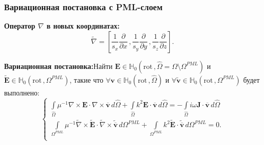 \documentclass[aspectratio=43]{beamer}
\newcommand{\MakeTitle}[1]{\frametitle{\hspace{1.5em}\textbf{#1} \hfill \insertframenumber{} }}
\begin{document}

\begin{frame}
	\MakeTitle{Вариационная постановка с PML-слоем}
	\textbf{Оператор $\nabla$ в новых координатах:}
	\begin{equation*}
		\tilde{\nabla} = \left[ \frac{1}{s_x} \frac{\partial}{\partial x} \,, \frac{1}{s_y} \frac{\partial}{\partial y} \,, \frac{1}{s_z} \frac{\partial}{\partial z} \right] .
	\end{equation*}

	\textbf{Вариационная постановка:}\newline Найти $\mathbf{E} \in \mathbb{H}_{0}( \mathrm{rot}\,, \widehat{\Omega} = \Omega \setminus {\Omega^{PML}} )$ и  $\tilde{\mathbf{E}} \in \mathbb{H}_{0}( \mathrm{rot}\,, {\Omega^{PML}} )$, такие что $\forall \mathbf{v} \in \mathbb{H}_{0}( \mathrm{rot}\,, \widehat{\Omega} )$ и $\forall \tilde{\mathbf{v}} \in \mathbb{H}_{0}( \mathrm{rot}\,, {\Omega^{PML}} )$ будет выполнено:
\begin{equation*}
	\begin{cases}
		\displaystyle
		\int\limits_{\widehat{\Omega}} \mu^{-1} \nabla \times \mathbf{E} \cdot \nabla \times \overline{\mathbf{v}} \,d\widehat{\Omega} + \int\limits_{\widehat{\Omega}} k^{2} \mathbf{E} \cdot \overline{\mathbf{v}} \,d\widehat{\Omega} = - \int\limits_{\widehat{\Omega}} i \omega \mathbf{J} \cdot \overline{\mathbf{v}} \,d\widehat{\Omega} \\
		\displaystyle
		\int\limits_{{\Omega^{PML}}} \mu^{-1} \tilde{\nabla} \times \tilde{\mathbf{E}} \cdot \tilde{\nabla} \times \tilde{\overline{\mathbf{v}}} \,d{\Omega^{PML}} + \int\limits_{{\Omega^{PML}}} k^{2} \tilde{\mathbf{E}} \cdot \tilde{\overline{\mathbf{v}}} \,d{\Omega^{PML}} = 0 . \\
	\end{cases}
\end{equation*}
\end{frame}

\end{document}
